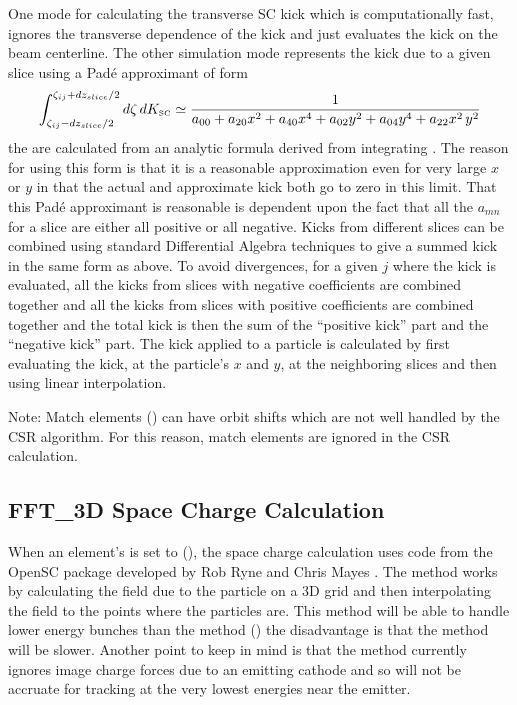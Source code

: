One mode for calculating the transverse SC kick which is computationally fast, ignores the
transverse dependence of the kick and just evaluates the kick on the beam centerline. The other
simulation mode represents the kick due to a given slice using a Pad{\'e} approximant of form
\begin{equation}
  \int_{\zeta_{ij}-dz_{slice}/2}^{\zeta_{ij}+dz_{slice}/2} d\zeta \, dK_{\mbox{\tiny SC}}
  \simeq \frac{1}{a_{00} + a_{20} x^2 + a_{40} x^4 + a_{02} y^2 + a_{04} y^4 + a_{22} x^2 \, y^2}
\end{equation}
the  are calculated from an analytic formula derived from integrating . The
reason for using this form is that it is a reasonable approximation even for very large $x$ or $y$
in that the actual and approximate kick both go to zero in this limit. That this Pad{\'e}
approximant is reasonable is dependent upon the fact that all the $a_{mn}$ for a slice are either
all positive or all negative. Kicks from different slices can be combined using standard
Differential Algebra techniques to give a summed kick in the same form as above. To avoid
divergences, for a given $j$ where the kick is evaluated, all the kicks from slices with negative
coefficients are combined together and all the kicks from slices with positive coefficients are
combined together and the total kick is then the sum of the ``positive kick'' part and the
``negative kick'' part. The kick applied to a particle is calculated by first evaluating the kick,
at the particle's $x$ and $y$, at the neighboring slices and then using linear interpolation.

Note: Match elements () can have orbit shifts which are not well handled by the CSR
algorithm. For this reason, match elements are ignored in the CSR calculation.

\subsection{FFT_3D Space Charge Calculation}
\label{s:sc.fft}

When an element's  is set to  (), the space
charge calculation uses code from the OpenSC package developed by Rob Ryne and Chris Mayes
\cite{b:opensc}. The method works by calculating the field due to the particle on a 3D grid and then
interpolating the field to the points where the particles are. This method will be able to handle
lower energy bunches than the  method () the disadvantage is that the
 method will be slower. Another point to keep in mind is that the  method
currently ignores image charge forces due to an emitting cathode and so will not be accruate for
tracking at the very lowest energies near the emitter.

